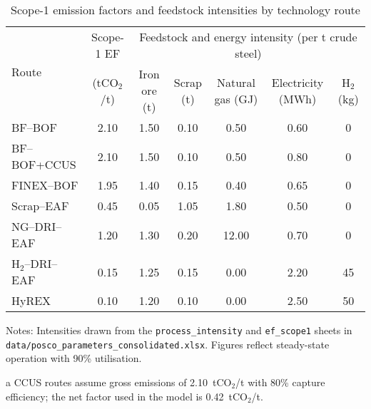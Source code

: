 \begin{table}[ht]
  \centering
  \caption{Scope-1 emission factors and feedstock intensities by technology route}
  \label{tab:tech-intensity}
  \begin{threeparttable}
  \begin{tabular}{@{}lcccccc@{}}
    \toprule
    \multirow{2}{*}{Route} & Scope-1 EF & \multicolumn{5}{c}{Feedstock and energy intensity (per t crude steel)} \\
    \cmidrule(lr){3-7}
     & (tCO$_2$/t) & Iron ore (t) & Scrap (t) & Natural gas (GJ) & Electricity (MWh) & H$_2$ (kg) \\
    \midrule
    BF--BOF & 2.10 & 1.50 & 0.10 & 0.50 & 0.60 & 0 \\
    BF--BOF+CCUS & 2.10\tnote{a} & 1.50 & 0.10 & 0.50 & 0.80 & 0 \\
    FINEX--BOF & 1.95 & 1.40 & 0.15 & 0.40 & 0.65 & 0 \\
    Scrap--EAF & 0.45 & 0.05 & 1.05 & 1.80 & 0.50 & 0 \\
    NG--DRI--EAF & 1.20 & 1.30 & 0.20 & 12.00 & 0.70 & 0 \\
    H$_2$--DRI--EAF & 0.15 & 1.25 & 0.15 & 0.00 & 2.20 & 45 \\
    HyREX & 0.10 & 1.20 & 0.10 & 0.00 & 2.50 & 50 \\
    \bottomrule
  \end{tabular}
  \begin{tablenotes}
    \footnotesize
    \item Notes: Intensities drawn from the \texttt{process\_intensity} and \texttt{ef\_scope1} sheets in \texttt{data/posco\_parameters\_consolidated.xlsx}. Figures reflect steady-state operation with 90\% utilisation.
    \item[a] CCUS routes assume gross emissions of 2.10~tCO$_2$/t with 80\% capture efficiency; the net factor used in the model is 0.42~tCO$_2$/t.
  \end{tablenotes}
  \end{threeparttable}
\end{table}
